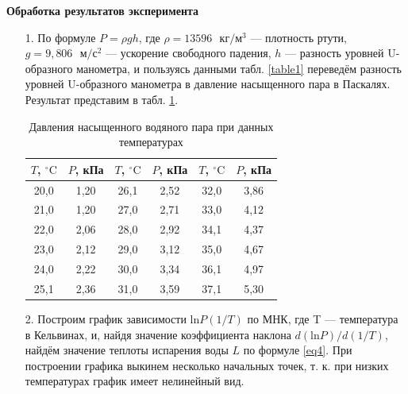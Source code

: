 \documentclass[a4paper, 12pt]{article}
\begin{document}
    \begin{flushleft}
        {\Large {\bf Обработка результатов эксперимента}}
    \end{flushleft}
    
    \begin{enumerate}
    
        \item[1.] По формуле $P = \rho g h$, где $\rho = 13596 \text{ } кг/м^3$ — плотность ртути, $g = 9,806 \text{ } м/с^2$ — ускорение свободного падения, $h$ — разность уровней U-образного манометра, и пользуясь данными табл. \ref{table1} переведём разность уровней U-образного манометра в давление насыщенного пара в Паскалях. Результат представим в табл. \ref{table2}.
        
        \begin{table}[ht]
            \centering
            \begin{tabular}{||c|c||c|c||c|c||}
                \hline
                $T$, $^\circ\text{C}$ & $P$, кПа & $T$, $^\circ\text{C}$ & $P$, кПа & $T$, $^\circ\text{C}$ & $P$, кПа \\ 
                \hline
                20,0 & 1,20 & 26,1 & 2,52 & 32,0 & 3,86 \\
                \hline
                21,0 & 1,20 & 27,0 & 2,71 & 33,0 & 4,12 \\
                \hline
                22,0 & 2,06 & 28,0 & 2,92 & 34,1 & 4,37 \\
                \hline
                23,0 & 2,12 & 29,0 & 3,12 & 35,0 & 4,67 \\
                \hline
                24,0 & 2,22 & 30,0 & 3,34 & 36,1 & 4,97 \\
                \hline
                25,1 & 2,36 & 31,0 & 3,59 & 37,1 & 5,30 \\
                \hline
            \end{tabular}
            \caption{Давления насыщенного водяного пара при данных температурах}
            \label{table2}
        \end{table}
        
        \item[2.] Построим график зависимости $\text{ln}P(1/T)$ по МНК, где T — температура в Кельвинах, и, найдя значение коэффициента наклона $d(\text{ln}P)/d(1/T)$, найдём значение теплоты испарения воды $L$ по формуле \eqref{eq4}. При построении графика выкинем несколько начальных точек, т. к. при низких температурах график имеет нелинейный вид.
        

\end{enumerate}
\end{document}
